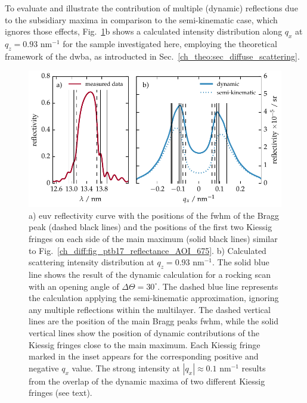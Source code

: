 To evaluate and illustrate the contribution of multiple (dynamic) reflections due to the subsidiary maxima in comparison to the semi-kinematic case, which ignores those effects, Fig.~\ref{ch_diff:fig_kiessig_like_peak_along_qx}b shows a calculated intensity distribution along $q_x$ at $q_z=0.93$ nm$^{-1}$ for the sample investigated here, employing the theoretical framework of the \gls{dwba}, as introducted in Sec.~\ref{ch_theo:sec_diffuse_scattering}.
\begin{figure}[htbp]
        \includegraphics[width=\textwidth]{img/qx_kinematic_vs_dynamic}
        \caption{a) \gls{euv} reflectivity curve with the positions of the \gls{fwhm} of the Bragg peak (dashed black lines) and the positions of the first two Kiessig fringes on each side of the main maximum (solid black lines) similar to Fig.~\ref{ch_diff:fig_ptb17_reflectance_AOI_675}. b) Calculated scattering intensity distribution at $q_z=0.93$ nm$^{-1}$. The solid blue line shows the result of the dynamic calculation for a rocking scan with an opening angle of $\Delta\Theta=30^\circ$. The dashed blue line represents the calculation applying the semi-kinematic approximation, ignoring any multiple reflections within the multilayer. The dashed vertical lines are the position of the main Bragg peaks \gls{fwhm}, while the solid vertical lines show the position of dynamic contributions of the Kiessig fringes close to the main maximum. Each Kiessig fringe marked in the inset appears for the corresponding positive and negative $q_x$ value. The strong intensity at $|q_x|\approx0.1$ nm$^{-1}$ results from the overlap of the dynamic maxima of two different Kiessig fringes (see text).} \label{ch_diff:fig_kiessig_like_peak_along_qx} 
\end{figure}
